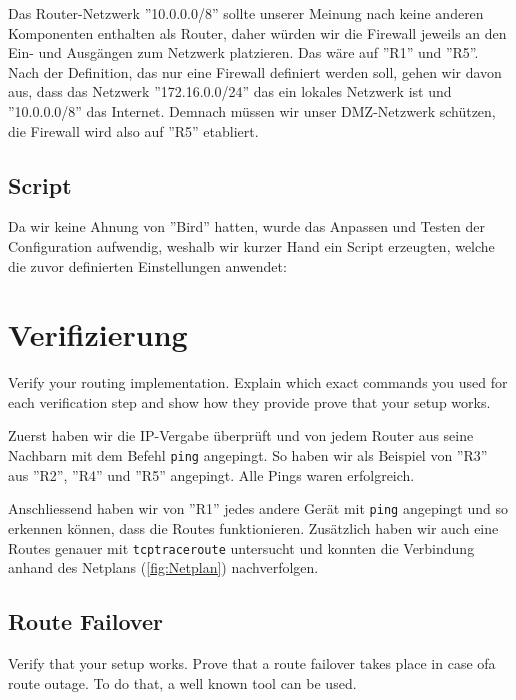 \documentclass[11pt,titlepage]{article}
\newenvironment{shadedquotation}
 {\begin{shaded*}
  \quoting[leftmargin=0pt, vskip=0pt]
 }
 {\endquoting
 \end{shaded*}
}
\begin{document}
Das Router-Netzwerk ''10.0.0.0/8'' sollte unserer Meinung nach keine anderen Komponenten enthalten als Router, daher würden wir die Firewall jeweils an den Ein- und Ausgängen zum Netzwerk platzieren. Das wäre auf ''R1'' und ''R5''.
\medskip
Nach der Definition, das nur eine Firewall definiert werden soll, gehen wir davon aus, dass das Netzwerk ''172.16.0.0/24'' das ein lokales Netzwerk ist und ''10.0.0.0/8'' das Internet. Demnach müssen wir unser DMZ-Netzwerk schützen, die Firewall wird also auf ''R5'' etabliert.
\medskip


\subsection{Script}
\label{subsec:Script}

Da wir keine Ahnung von ''Bird'' hatten, wurde das Anpassen und Testen der Configuration aufwendig, weshalb wir kurzer Hand ein Script erzeugten, welche die zuvor definierten Einstellungen anwendet:



\section{Verifizierung}
\label{sec:Verifizierung}
\begin{shadedquotation}
  Verify your routing implementation. Explain which exact commands you used for each verification step and show how they provide prove that your setup works.
\end{shadedquotation}
Zuerst haben wir die IP-Vergabe überprüft und von jedem Router aus seine Nachbarn mit dem Befehl \lstinline!ping! angepingt. So haben wir als Beispiel von ''R3'' aus ''R2'', ''R4'' und ''R5'' angepingt.
Alle Pings waren erfolgreich.

\medskip

Anschliessend haben wir von ''R1'' jedes andere Gerät mit \lstinline!ping! angepingt und so erkennen können, dass die Routes funktionieren. Zusätzlich haben wir auch eine Routes genauer mit \lstinline!tcptraceroute! untersucht und konnten die Verbindung anhand des Netplans (\autoref{fig:Netplan}) nachverfolgen.  

\subsection{Route Failover}
\label{subsec:RouteFailover}
\begin{shadedquotation}
  Verify that your setup works. Prove that a route failover takes place in case ofa route outage. To do that, a well known tool can be used.
\end{shadedquotation}
\end{document}
